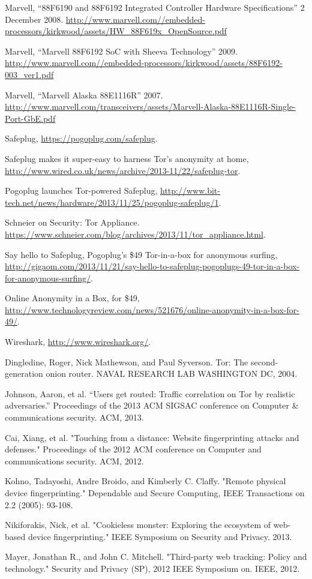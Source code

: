 \begin{thebibliography}{99}

 Marvell, ``88F6190 and 88F6192 Integrated Controller Hardware Specifications'' 2 December 2008. \url{http://www.marvell.com//embedded-processors/kirkwood/assets/HW_88F619x_OpenSource.pdf}

 Marvell, ``Marvell 88F6192 SoC with Sheeva Technology'' 2009. \url{http://www.marvell.com//embedded-processors/kirkwood/assets/88F6192-003_ver1.pdf}

 Marvell, ``Marvell Alaska 88E1116R'' 2007. \url{http://www.marvell.com/transceivers/assets/Marvell-Alaska-88E1116R-Single-Port-GbE.pdf}

 Safeplug, \url{https://pogoplug.com/safeplug}.

 Safeplug makes it super-easy to harness Tor's anonymity at home, \url{http://www.wired.co.uk/news/archive/2013-11/22/safeplug-tor}.

 Pogoplug launches Tor-powered Safeplug, \url{http://www.bit-tech.net/news/hardware/2013/11/25/pogoplug-safeplug/1}.

 Schneier on Security: Tor Appliance.  \url{https://www.schneier.com/blog/archives/2013/11/tor_appliance.html}.

 Say hello to Safeplug, Pogoplug’s \$49 Tor-in-a-box for anonymous surfing, \url{http://gigaom.com/2013/11/21/say-hello-to-safeplug-pogoplugs-49-tor-in-a-box-for-anonymous-surfing/}.

 Online Anonymity in a Box, for \$49, \url{http://www.technologyreview.com/news/521676/online-anonymity-in-a-box-for-49/}.

 Wireshark, \url{http://www.wireshark.org/}. 

 Dingledine, Roger, Nick Mathewson, and Paul Syverson. Tor: The second-generation onion router. NAVAL RESEARCH LAB WASHINGTON DC, 2004.

 Johnson, Aaron, et al. ``Users get routed: Traffic correlation on Tor by realistic adversaries.'' Proceedings of the 2013 ACM SIGSAC conference on Computer \& communications security. ACM, 2013.

 Cai, Xiang, et al. "Touching from a distance: Website fingerprinting attacks and defenses." Proceedings of the 2012 ACM conference on Computer and communications security. ACM, 2012.

 Kohno, Tadayoshi, Andre Broido, and Kimberly C. Claffy. "Remote physical device fingerprinting." Dependable and Secure Computing, IEEE Transactions on 2.2 (2005): 93-108.

 Nikiforakis, Nick, et al. "Cookieless monster: Exploring the ecosystem of web-based device fingerprinting." IEEE Symposium on Security and Privacy. 2013.

 Mayer, Jonathan R., and John C. Mitchell. "Third-party web tracking: Policy and technology." Security and Privacy (SP), 2012 IEEE Symposium on. IEEE, 2012.

\end{thebibliography}
